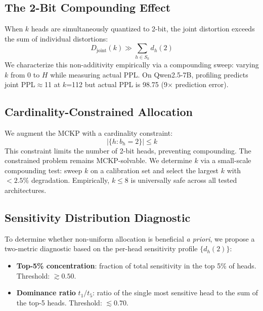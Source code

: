 \documentclass[11pt,a4paper]{article}
\begin{document}
\subsection{The 2-Bit Compounding Effect}

When $k$ heads are simultaneously quantized to 2-bit, the joint distortion exceeds the sum of individual distortions:
\begin{equation}
D_{\text{joint}}(k) \gg \sum_{h \in S_k} d_h(2)
\label{eq:nonadditivity}
\end{equation}
We characterize this non-additivity empirically via a compounding sweep: varying $k$ from 0 to $H$ while measuring actual PPL.
On Qwen2.5-7B, profiling predicts joint PPL$\approx$11 at $k$=112 but actual PPL is 98.75 (9$\times$ prediction error).

\subsection{Cardinality-Constrained Allocation}

We augment the MCKP with a cardinality constraint:
\begin{equation}
|\{h : b_h = 2\}| \le k
\label{eq:constraint}
\end{equation}
This constraint limits the number of 2-bit heads, preventing compounding.
The constrained problem remains MCKP-solvable.
We determine $k$ via a small-scale compounding test: sweep $k$ on a calibration set and select the largest $k$ with $<2.5\%$ degradation.
Empirically, $k \le 8$ is universally safe across all tested architectures.

\subsection{Sensitivity Distribution Diagnostic}

To determine whether non-uniform allocation is beneficial \emph{a priori}, we propose a two-metric diagnostic based on the per-head sensitivity profile $\{d_h(2)\}$:

\begin{itemize}
\item \textbf{Top-5\% concentration}: fraction of total sensitivity in the top 5\% of heads. Threshold: $\gtrsim 0.50$.
\item \textbf{Dominance ratio} $t_1/t_5$: ratio of the single most sensitive head to the sum of the top-5 heads. Threshold: $\lesssim 0.70$.
\end{itemize}
\end{document}
